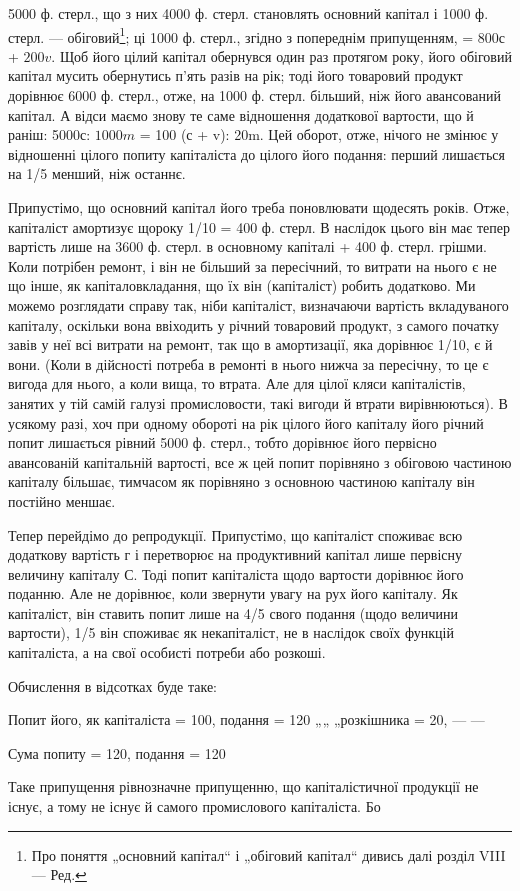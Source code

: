 \parcont{}  %
5000 ф. стерл., що з них 4000 ф. стерл. становлять основний капітал і
1000 ф. стерл. — обіговий\footnote*{
Про поняття „основний капітал“ і „обіговий капітал“ дивись далі розділ
VIII — Ред.
}; ці 1000 ф. стерл., згідно з попереднім
припущенням, = 800с + $200v$. Щоб його цілий капітал обернувся
один раз протягом року, його обіговий капітал мусить обернутись п’ять
разів на рік; тоді його товаровий продукт дорівнює 6000 ф. стерл.,
отже, на 1000 ф. стерл. більший, ніж його авансований капітал. А відси
маємо знову те саме відношення додаткової вартости, що й раніш:
5000с: $1000m$ = 100 (с + v): 20m. Цей оборот, отже, нічого не
змінює у відношенні цілого попиту капіталіста до цілого його подання:
перший лишається на 1/5 менший, ніж останнє.

Припустімо, що основний капітал його треба поновлювати щодесять
років. Отже, капіталіст амортизує щороку 1/10 = 400 ф. стерл. В наслідок
цього він має тепер вартість лише на 3600 ф. стерл. в основному капіталі
+ 400 ф. стерл. грішми. Коли потрібен ремонт, і він не більший за
пересічний, то витрати на нього є не що інше, як капіталовкладання, що
їх він (капіталіст) робить додатково. Ми можемо розглядати справу так,
ніби капіталіст, визначаючи вартість вкладуваного капіталу, оскільки
вона ввіходить у річний товаровий продукт, з самого початку завів у
неї всі витрати на ремонт, так що в амортизації, яка дорівнює 1/10,
є й вони. (Коли в дійсності потреба в ремонті в нього нижча
за пересічну, то це є вигода для нього, а коли вища, то втрата. Але
для цілої кляси капіталістів, занятих у тій самій галузі промисловости,
такі вигоди й втрати вирівнюються). В усякому разі, хоч при одному
обороті на рік цілого його капіталу його річний попит лишається рівний
5000 ф. стерл., тобто дорівнює його первісно авансованій капітальній
вартості, все ж цей попит порівняно з обіговою частиною капіталу
більшає, тимчасом як порівняно з основною частиною капіталу він постійно
меншає.

Тепер перейдімо до репродукції. Припустімо, що капіталіст споживає
всю додаткову вартість г і перетворює на продуктивний капітал лише
первісну величину капіталу С. Тоді попит капіталіста щодо вартости
дорівнює його поданню. Але не дорівнює, коли звернути увагу на рух
його капіталу. Як капіталіст, він ставить попит лише на 4/5 свого подання
(щодо величини вартости), 1/5 він споживає як некапіталіст, не
в наслідок своїх функцій капіталіста, а на свої особисті потреби або
розкоші.

Обчислення в відсотках буде таке:

Попит його, як капіталіста = 100, подання = 120
    „„       „розкішника = 20, — —

            Сума попиту = 120, подання = 120

Таке припущення рівнозначне припущенню, що капіталістичної продукції
не існує, а тому не існує й самого промислового капіталіста. Бо
\parbreak{}  %
